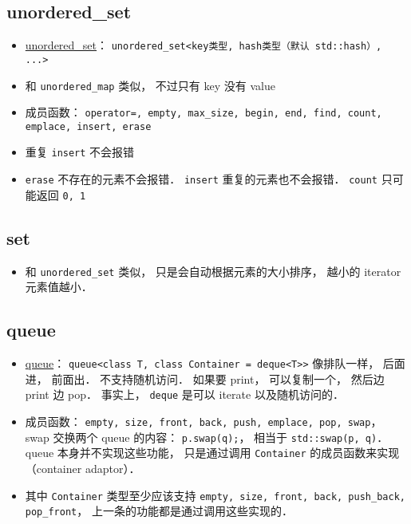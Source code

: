 \subsection{unordered\_set}
\begin{itemize}
\item \href{https://cplusplus.com/reference/unordered_set/unordered_set/}{unordered\_set}： \verb|unordered_set<key类型, hash类型（默认 std::hash）, ...>|
\item 和 \verb|unordered_map| 类似， 不过只有 key 没有 value
\item 成员函数： \verb|operator=, empty, max_size, begin, end, find, count, emplace, insert, erase|
\item 重复 \verb|insert| 不会报错
\item \verb|erase| 不存在的元素不会报错． \verb|insert| 重复的元素也不会报错． \verb|count| 只可能返回 \verb|0, 1|
\end{itemize}

\subsection{set}
\begin{itemize}
\item 和 \verb|unordered_set| 类似， 只是会自动根据元素的大小排序， 越小的 iterator 元素值越小．
\end{itemize}


\subsection{queue}
\begin{itemize}
\item \href{https://cplusplus.com/reference/queue/queue/}{queue}： \verb|queue<class T, class Container = deque<T>>| 像排队一样， 后面进， 前面出． 不支持随机访问． 如果要 print， 可以复制一个， 然后边 print 边 pop． 事实上， \verb|deque| 是可以 iterate 以及随机访问的．
\item 成员函数： \verb|empty, size, front, back, push, emplace, pop, swap|， swap 交换两个 queue 的内容： \verb|p.swap(q);|， 相当于 \verb|std::swap(p, q)|． queue 本身并不实现这些功能， 只是通过调用 \verb|Container| 的成员函数来实现（container adaptor）．
\item 其中 \verb|Container| 类型至少应该支持 \verb|empty, size, front, back, push_back, pop_front|， 上一条的功能都是通过调用这些实现的．
\end{itemize}

